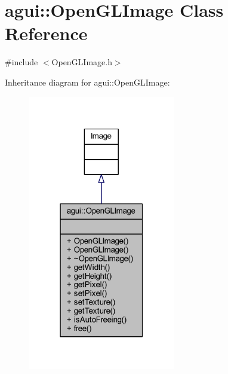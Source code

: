 \hypertarget{classagui_1_1_open_g_l_image}{}\section{agui\+:\+:Open\+G\+L\+Image Class Reference}
\label{classagui_1_1_open_g_l_image}


{\ttfamily \#include $<$Open\+G\+L\+Image.\+h$>$}



Inheritance diagram for agui\+:\+:Open\+G\+L\+Image\+:\nopagebreak
\begin{figure}[H]
\begin{center}
\leavevmode
\includegraphics[width=183pt]{classagui_1_1_open_g_l_image__inherit__graph}
\end{center}
\end{figure}


